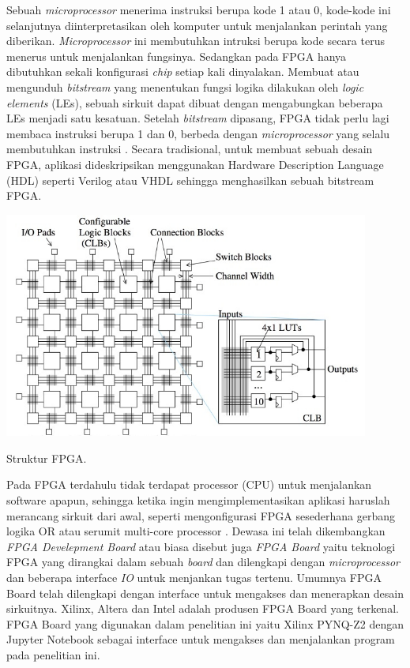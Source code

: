 Sebuah \textit{microprocessor} menerima instruksi berupa kode 1 atau 0, kode-kode ini selanjutnya diinterpretasikan oleh komputer untuk menjalankan perintah yang diberikan. \textit{Microprocessor} ini membutuhkan intruksi berupa kode secara terus menerus untuk menjalankan fungsinya. Sedangkan pada FPGA hanya dibutuhkan sekali konfigurasi \textit{chip} setiap kali dinyalakan. Membuat atau mengunduh \textit{bitstream} yang menentukan fungsi logika dilakukan oleh \textit{logic elements} (LEs), sebuah sirkuit dapat dibuat dengan mengabungkan beberapa LEs menjadi satu kesatuan. Setelah \textit{bitstream} dipasang, FPGA tidak perlu lagi membaca instruksi berupa 1 dan 0, berbeda dengan \textit{microprocessor} yang selalu membutuhkan instruksi . Secara tradisional, untuk membuat sebuah desain FPGA, aplikasi dideskripsikan menggunakan Hardware Description Language (HDL) seperti Verilog atau VHDL sehingga menghasilkan sebuah bitstream FPGA. 

\begin{afigure}
    \includegraphics[width=12cm, center]{images/fpga-structure.jpeg}
    \caption{Struktur FPGA.}
    \label{fig:fpga-structure}
\end{afigure}

Pada FPGA terdahulu tidak terdapat processor (CPU) untuk menjalankan software apapun, sehingga ketika ingin mengimplementasikan aplikasi haruslah merancang sirkuit dari awal, seperti mengonfigurasi FPGA sesederhana gerbang logika OR atau serumit multi-core processor . Dewasa ini telah dikembangkan \textit{FPGA Develepment Board} atau biasa disebut juga \textit{FPGA Board} yaitu teknologi FPGA yang dirangkai dalam sebuah \textit{board} dan dilengkapi dengan \textit{microprocessor} dan beberapa interface \textit{IO} untuk menjankan tugas tertenu. Umumnya FPGA Board telah dilengkapi dengan interface untuk mengakses dan menerapkan desain sirkuitnya. Xilinx, Altera dan Intel adalah produsen FPGA Board yang terkenal. FPGA Board yang digunakan dalam penelitian ini yaitu Xilinx PYNQ-Z2 dengan Jupyter Notebook sebagai interface untuk mengakses dan menjalankan program pada penelitian ini.

